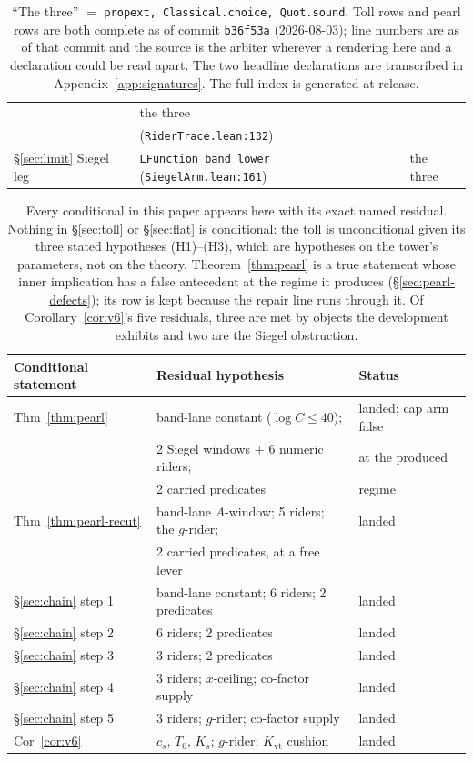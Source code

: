 \documentclass[11pt]{amsart}
\newcommand{\leaninline}[1]{{\small\texttt{#1}}}
\theoremstyle{remark}
\begin{document}
\begin{table}[h]
\begin{tabular}{lll}
  & the three \\
 & (\texttt{RiderTrace.lean:132}) & \\
\S\ref{sec:limit} Siegel leg & \leaninline{LFunction\_band\_lower}
  (\texttt{SiegelArm.lean:161}) & the three \\
\bottomrule
\end{tabular}
\caption{``The three'' $=$ \leaninline{propext, Classical.choice,
Quot.sound}. Toll rows and pearl rows are both complete as of commit
\leaninline{b36f53a} (2026-08-03); line numbers are as of that commit and the
source is the arbiter wherever a rendering here and a declaration could be read
apart. The two headline declarations are transcribed in
Appendix~\ref{app:signatures}. The full index is generated at release.}
\label{tab:index}
\end{table}

\begin{table}[h]
\centering\small
\begin{tabular}{lll}
\toprule
Conditional statement & Residual hypothesis & Status \\
\midrule
Thm~\ref{thm:pearl} & band-lane constant ($\log C \le 40$); & landed;
  cap arm false \\
 & 2 Siegel windows $+$ 6 numeric riders; & at the produced \\
 & 2 carried predicates & regime \\
Thm~\ref{thm:pearl-recut} & band-lane $A$-window; 5 riders; the
  $g$-rider; & landed \\
 & 2 carried predicates, at a free lever & \\
\S\ref{sec:chain} step 1 & band-lane constant; 6 riders; 2 predicates
  & landed \\
\S\ref{sec:chain} step 2 & 6 riders; 2 predicates & landed \\
\S\ref{sec:chain} step 3 & 3 riders; 2 predicates & landed \\
\S\ref{sec:chain} step 4 & 3 riders; $x$-ceiling; co-factor supply & landed \\
\S\ref{sec:chain} step 5 & 3 riders; $g$-rider; co-factor supply & landed \\
Cor~\ref{cor:v6} & $c_s$, $T_0$, $K_s$; $g$-rider; $K_{\mathrm{vt}}$ cushion
  & landed \\
\bottomrule
\end{tabular}
\caption{Every conditional in this paper appears here with its exact
named residual.
Nothing in \S\ref{sec:toll} or \S\ref{sec:flat} is conditional: the toll
is unconditional given its three stated hypotheses (H1)--(H3), which are
hypotheses on the tower's parameters, not on the theory. Theorem~\ref{thm:pearl}
is a true statement whose inner implication has a false antecedent at the
regime it produces (\S\ref{sec:pearl-defects}); its row is kept because the
repair line runs through it. Of Corollary~\ref{cor:v6}'s five residuals, three
are met by objects the development exhibits and two are the Siegel
obstruction.}
\label{tab:conditional}
\end{table}
\end{document}
